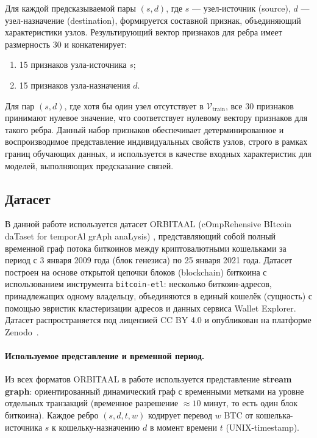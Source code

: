 \documentclass[a4paper,12pt]{extarticle}
\begin{document}
Для каждой предсказываемой пары $(s, d)$, где $s$ — узел-источник (source), $d$ — узел-назначение (destination), формируется составной признак, объединяющий характеристики узлов. Результирующий вектор признаков для ребра имеет размерность 30 и конкатенирует:
\begin{enumerate}
    \item 15 признаков узла-источника $s$;
    \item 15 признаков узла-назначения $d$.
\end{enumerate}
Для пар $(s, d)$, где хотя бы один узел отсутствует в $\mathcal{V}_{\text{train}}$, все 30 признаков принимают нулевое значение, что соответствует нулевому вектору признаков для такого ребра. Данный набор признаков обеспечивает детерминированное и воспроизводимое представление индивидуальных свойств узлов, строго в рамках границ обучающих данных, и используется в качестве входных характеристик для моделей, выполняющих предсказание связей.

\subsection{Датасет}

В данной работе используется датасет ORBITAAL (cOmpRehensive BItcoin daTaset for temporAl grAph anaLysis) \cite{orbitaal2024}, представляющий собой полный временной граф потока биткоинов между криптовалютными кошельками за период с 3 января 2009 года (блок генезиса) по 25 января 2021 года. Датасет построен на основе открытой цепочки блоков (blockchain) биткоина с использованием инструмента \texttt{bitcoin-etl}: несколько биткоин-адресов, принадлежащих одному владельцу, объединяются в единый кошелёк (сущность) с помощью эвристик кластеризации адресов и данных сервиса Wallet Explorer. Датасет распространяется под лицензией CC BY 4.0 и опубликован на платформе Zenodo~\cite{orbitaal2024}.

\paragraph{Используемое представление и временной период.}
Из всех форматов ORBITAAL в работе используется представление \textbf{stream graph}: ориентированный динамический граф с временными метками на уровне отдельных транзакций (временное разрешение $\approx 10$ минут, то есть один блок биткоина). Каждое ребро $(s, d, t, w)$ кодирует перевод $w$ BTC от кошелька-источника $s$ к кошельку-назначению $d$ в момент времени $t$ (UNIX-timestamp).
\end{document}
